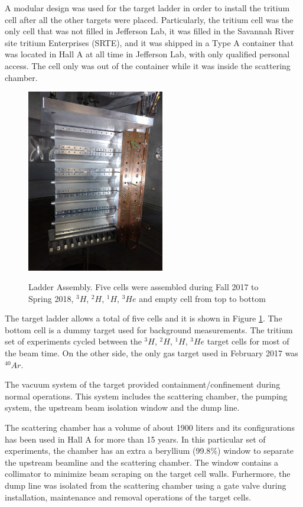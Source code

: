 \documentclass[final,5p,times,twocolumn]{elsarticle}
\begin{document}
A modular design was used for the target ladder in order to install the tritium cell after all the other targets were placed. Particularly, the tritium cell was the only cell that was not filled in Jefferson Lab, it was filled in the Savannah River site tritium Enterprises (SRTE), and it was shipped in a Type A container that was located in Hall A at all time in Jefferson Lab, with only qualified personal access. The cell only was out of the container while it was inside the scattering chamber. 

\begin{figure}[htbp]
\centering
  \includegraphics[width=6cm]{images/ladder.jpg}\\
  \caption{Ladder Assembly. Five cells were assembled during Fall 2017 to Spring 2018, $^{3}H$, $^{2}H$, $^{1}H $, $^{3}He$ and empty cell from top to bottom
 }\label{ladder}
\end{figure}


The target ladder allows a total of five cells and it is shown in Figure \ref{ladder}.  The bottom cell is a dummy target used for background measurements. The tritium set of experiments cycled between the $^{3}H$, $^{2}H$, $^{1}H $, $^{3}He$ target cells for most of the beam time. On the other side, the only gas target used in February 2017 was $^{40}Ar$.

The vacuum system of the target provided containment/confinement during normal operations. This system includes the scattering chamber, the pumping system, the upstream beam isolation window and the dump line.  

The scattering chamber has a volume of about 1900 liters and its configurations has been used in Hall A for more than 15 years. In this particular set of experiments, the chamber has an extra a beryllium (99.8$\%$) window to separate the upstream beamline and the scattering chamber. The window contains a collimator to minimize beam scraping on the target cell walls. Furhermore, the dump line was isolated from the scattering chamber using a gate valve during installation, maintenance and removal operations of the target cells. 
\end{document}
